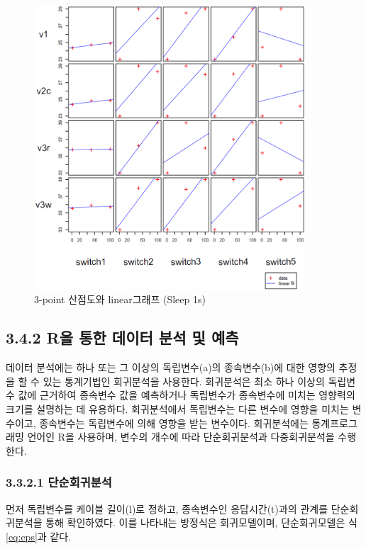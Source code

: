 \documentclass[11pt
  , a4paper
  , article
  , oneside
]{memoir}
\begin{document}
\begin{figure}[!htb]
  \centering
  \includegraphics[width=0.9\textwidth]{./images/3point_sleep1s.eps}
  \caption{3-point 산점도와 linear그래프 (Sleep 1s)}
  \label{fig:3ps1}   
\end{figure}

\clearpage

\subsection{3.4.2 R을 통한 데이터 분석 및 예측}
데이터 분석에는 하나 또는 그 이상의 독립변수(a)의 종속변수(b)에 대한 영향의 추정을 할 수 있는 통계기법인 회귀분석을 사용한다\citep{analysis}. 회귀분석은 최소 하나 이상의 독립변수 값에 근거하여 종속변수 값을 예측하거나 독립변수가 종속변수에 미치는 영향력의 크기를 설명하는 데 유용하다. 회귀분석에서 독립변수는 다른 변수에 영향을 미치는 변수이고, 종속변수는 독립변수에 의해 영향을 받는 변수이다. 회귀분석에는 통계프로그래밍 언어인 R을 사용하며, 변수의 개수에 따라 단순회귀분석과 다중회귀분석을 수행한다.
\subsubsection{3.3.2.1 단순회귀분석}
먼저 독립변수를 케이블 길이(l)로 정하고, 종속변수인 응답시간(t)과의 관계를 단순회귀분석을 통해 확인하였다. 이를 나타내는 방정식은 회귀모델이며, 단순회귀모델은 식 \ref{eq:eps}과 같다. 
\end{document}
